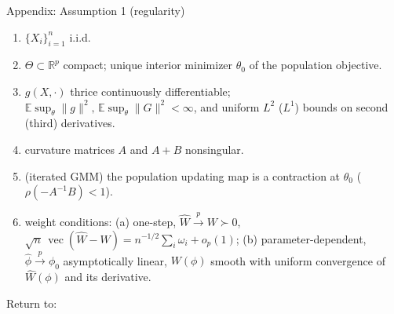 \documentclass[11pt,aspectratio=169]{beamer}
\newcommand{\E}{\mathbb{E}}
\newcommand{\vect}{\operatorname{vec}}
\begin{document}
\begin{frame}{Appendix: Assumption 1 (regularity)}
    \hypertarget{jump:assum}{}
    \begin{enumerate}\footnotesize\setlength{\itemsep}{0.35em}
        \item[(i)]   $\{X_i\}_{i=1}^n$ i.i.d.
        \item[(ii)]  $\Theta\subset\mathbb R^p$ compact; unique interior
                     minimizer $\theta_0$ of the population objective.
        \item[(iii)] $g(X,\cdot)$ thrice continuously differentiable;
                     $\E\sup_\theta\|g\|^2,\,\E\sup_\theta\|G\|^2<\infty$, and
                     uniform $L^2$ ($L^1$) bounds on second (third) derivatives.
        \item[(iv)]  curvature matrices $A$ and $A+B$ nonsingular.
        \item[(v)]   (iterated GMM) the population updating map is a contraction
                     at $\theta_0$ \; ($\rho(-A^{-1}B)<1$).
        \item[(vi)]  weight conditions: \;
                     (a) one-step, $\widehat W\xrightarrow{p}W\succ0$,
                     $\sqrt n\,\vect(\widehat W-W)=n^{-1/2}\sum_i\omega_i+o_p(1)$; \;
                     (b) parameter-dependent, $\widehat\phi\xrightarrow{p}\phi_0$
                     asymptotically linear, $W(\phi)$ smooth with uniform
                     convergence of $\widehat W(\phi)$ and its derivative.
    \end{enumerate}
    \vfill
    {\footnotesize Return to:}\;
    \hyperlink{jump:p1}{}\;
    \hyperlink{jump:p2}{}\;
    \hyperlink{jump:p3}{}\;
    \hyperlink{jump:p4}{}
\end{frame}
\end{document}
